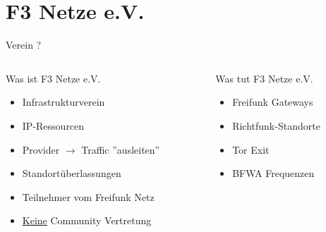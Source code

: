 \section{F3 Netze e.V.}

\begin{frame}{Verein ?}
    \begin{columns}[T]
        \begin{column}{0.45\textwidth}
            Was ist F3 Netze e.V.
            \begin{itemize}
                \item Infrastrukturverein
                \item IP-Ressourcen
                \item Provider $\rightarrow$ Traffic ''ausleiten''
                \item Standortüberlassungen
                \item Teilnehmer vom Freifunk Netz
                \item \underline{Keine} Community Vertretung
            \end{itemize}
        \end{column}
        \begin{column}{0.45\textwidth}
            Was tut F3 Netze e.V.
            \begin{itemize}
                \item Freifunk Gateways
                \item Richtfunk-Standorte
                \item Tor Exit
                \item BFWA Frequenzen
            \end{itemize}
        \end{column}
    \end{columns}
\end{frame}

